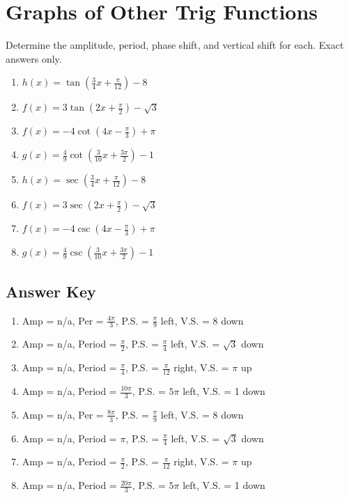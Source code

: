 \chapter{Graphs of Other Trig Functions}

Determine the amplitude, period, phase shift, and vertical shift for each. Exact answers only.

\begin{enumerate}
	\item $h(x) = \tan\left(\frac{3}{4}x + \frac{\pi}{12}\right) - 8$
	\item $f(x)=3\tan\left(2x+\frac{\pi}{2}\right)-\sqrt{3}$
	\item $f(x) = -4\cot\left(4x-\frac{\pi}{3}\right) + \pi$
	\item $g(x) = \frac{4}{9}\cot\left(\frac{3}{10}x + \frac{3\pi}{2}\right) - 1$
	\item $h(x) = \sec\left(\frac{3}{4}x + \frac{\pi}{12}\right) - 8$
	\item $f(x)=3\sec\left(2x+\frac{\pi}{2}\right)-\sqrt{3}$
	\item $f(x) = -4\csc\left(4x-\frac{\pi}{3}\right) + \pi$
	\item $g(x) = \frac{4}{9}\csc\left(\frac{3}{10}x + \frac{3\pi}{2}\right) - 1$
\end{enumerate}

\newpage

\section{Answer Key}

\begin{enumerate}
	\item Amp = n/a, Per = $\frac{4\pi}{3}$, P.S. = $\frac{\pi}{9}$ left, V.S. = 8 down
	\item Amp = n/a, Period = $\frac{\pi}{2}$, P.S. = $\frac{\pi}{4}$ left, V.S. = $\sqrt{3}$ down
	\item Amp = n/a, Period = $\frac{\pi}{4}$, P.S. = $\frac{\pi}{12}$ right, V.S. = $\pi$ up
	\item Amp = n/a, Period = $\frac{10\pi}{3}$, P.S. = $5\pi$ left, V.S. = 1 down
	
	\item Amp = n/a, Per = $\frac{8\pi}{3}$, P.S. = $\frac{\pi}{9}$ left, V.S. = 8 down
	\item Amp = n/a, Period = $\pi$, P.S. = $\frac{\pi}{4}$ left, V.S. = $\sqrt{3}$ down
	\item Amp = n/a, Period = $\frac{\pi}{2}$, P.S. = $\frac{\pi}{12}$ right, V.S. = $\pi$ up
	\item Amp = n/a, Period = $\frac{20\pi}{3}$, P.S. = $5\pi$ left, V.S. = 1 down
\end{enumerate}